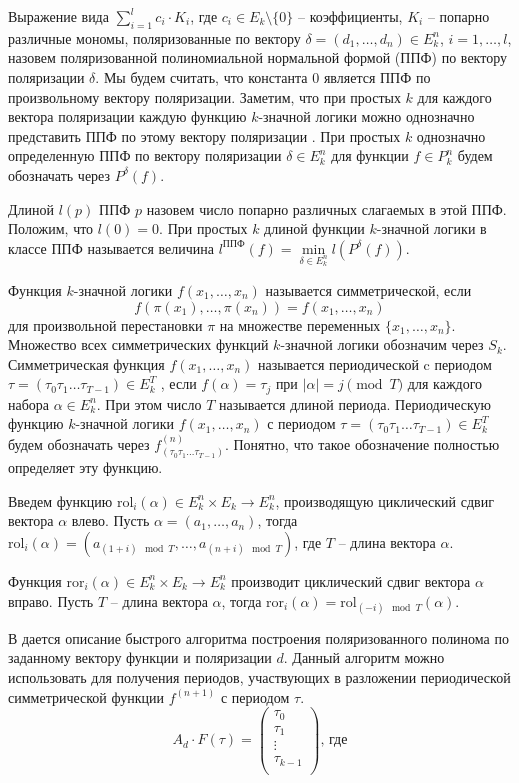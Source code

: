 \documentclass[bibliography=totoc, a4paper, 14pt]{extarticle}
\newcommand{\rol} {\textrm{rol}}
\newcommand{\ror} {\textrm{ror}}
\begin{document}
Выражение вида $\sum\limits_{i=1}^lc_i \cdot K_i$, где $c_i \in E_k\setminus\{0\}$ -- коэффициенты, $K_i$ -- попарно
различные мономы, поляризованные по вектору $\delta = (d_1, \dots, d_n) \in E_k^n$, $i = 1, \dots , l$, назовем
поляризованной полиномиальной нормальной формой (ППФ) по вектору поляризации $\delta$. Мы будем считать, что константа 0
является ППФ по произвольному вектору поляризации. Заметим, что при простых $k$ для каждого вектора поляризации каждую функцию
$k$\nobreakdash-значной логики можно однозначно представить ППФ по этому вектору поляризации \cite{ss02}. При простых $k$
однозначно определенную ППФ по вектору поляризации $\delta \in E_k^n$ для функции
$f \in P_k^n$ будем обозначать через $P^{\delta}(f)$.

Длиной $l(p)$ ППФ $p$ назовем число попарно различных слагаемых в этой
ППФ. Положим, что $l(0) = 0$. При простых $k$ длиной функции $k$\nobreakdash-значной
логики в классе ППФ называется величина $l^{\text{ППФ}}(f) = \min\limits_{\delta \in E_k^n}l(P^{\delta}(f))$.

Функция $k$\nobreakdash-значной логики $f(x_1 ,\dots , x_n)$ называется симметрической, если
$$f(\pi(x_1), \dots, \pi(x_n)) = f(x_1, \dots, x_n)$$
для произвольной перестановки $\pi$ на множестве переменных $\{x_1 , \dots , x_n \}$.
Множество всех симметрических функций $k$\nobreakdash-значной логики обозначим через $S_k$.
Симметрическая функция $f(x_1, \dots, x_n)$ называется периодической c
периодом $\tau = (\tau_0 \tau_1 \dots \tau_{T-1}) \in E_k^T$ , если $f(\alpha) = \tau_j$ при $|\alpha| = j \pmod T$
для каждого набора $\alpha \in E_k^n$. При этом число $T$ называется длиной периода. Периодическую функцию
$k$\nobreakdash-значной логики $f(x_1 , \dots , x_n)$ с периодом $\tau = (\tau_0 \tau_1 \dots \tau_{T-1}) \in E_k^T$
будем обозначать через $f^{(n)}_{(\tau_0 \tau_1 \dots \tau_{T-1})}$. Понятно, что
такое обозначение полностью определяет эту функцию.

Введем функцию $\rol_i(\alpha) \in E_k^n \times E_k \rightarrow E_k^n$, производящую циклический сдвиг вектора $\alpha$
влево. Пусть $\alpha = (a_1, \dots, a_n)$, тогда $\rol_i(\alpha) = (a_{(1+i)\mod T}, \dots, a_{(n+i)\mod T})$,
где $T$ -- длина вектора $\alpha$.

Функция $\ror_i(\alpha) \in E_k^n \times E_k \rightarrow E_k^n$ производит циклический сдвиг вектора $\alpha$
вправо. Пусть $T$ -- длина вектора $\alpha$, тогда $\ror_i(\alpha) = \rol_{(-i) \mod T}(\alpha)$.

В \cite{sm09} дается описание быстрого алгоритма построения поляризованного полинома по заданному вектору
функции и поляризации $d$. Данный алгоритм можно использовать для получения периодов, участвующих в разложении
периодической симметрической функции $f^{(n+1)}$ с периодом $\tau$. 
$$A_d \cdot F(\tau) = \begin{pmatrix}
\tau_0 \\
\tau_1 \\
\vdots \\
\tau_{k-1} \\
\end{pmatrix} \text{, где}
$$
\end{document}
